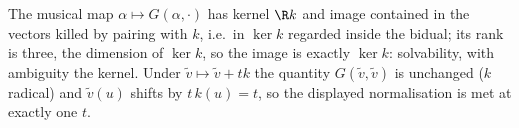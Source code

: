 The musical map $\alpha \mapsto G(\alpha, \cdot)$ has kernel $\R k$ and image contained in the vectors killed by pairing with $k$, i.e.\ in $\ker k$ regarded inside the bidual; its rank is three, the dimension of $\ker k$, so the image is exactly $\ker k$: solvability, with ambiguity the kernel. Under $\tilde v \mapsto \tilde v + tk$ the quantity $G(\tilde v, \tilde v)$ is unchanged ($k$ radical) and $\tilde v(u)$ shifts by $t\,k(u) = t$, so the displayed normalisation is met at exactly one $t$.
